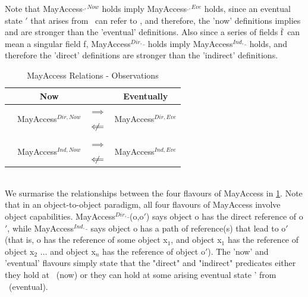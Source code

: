 \documentclass[a4paper,11pt,twoside]{article}
\newcommand*\rot{\rotatebox{90}}
\newcommand{\loimplies}{$\implies$}
\newcommand{\lonimplies}{$\centernot\implies$}
\newcommand{\loimpliedby}{$\Longleftarrow$}
\newcommand{\lonimpliedby}{$\centernot\Longleftarrow$}
\newcommand{\losigma}{\text{$\upsigma$}}
\newcommand{\loconj}[1] {$\bar{\text{#1}}$}
\begin{document}
Note that MayAccess$^{\_,Now}$ holds imply MayAccess$^{\_,Eve}$ holds, since an eventual state \losigma$'$ that arises from \losigma\, can refer to \losigma, and therefore, the 'now' definitions implies and are stronger than the 'eventual' definitions. Also since a series of fields \loconj{f}\ can mean a singular field f, MayAccess$^{Dir,\_}$ holds imply MayAccess$^{Ind,\_}$ holds, and therefore the 'direct' definitions are stronger than the 'indirect' definitions. \\
\begin{table}[htb]
\caption{MayAccess Relations - Observations}\label{tab:accessrelations}
\centering
\begin{tabular*}{0.5\linewidth}{c|ccc}\toprule
& \bf Now & & \bf Eventually\\
\hline
\multirow{5}{*}{\rot{\bf Indirect \enspace Direct \:}} & \multirow{2}{*}{MayAccess$^{Dir,Now}$} & \loimplies & \multirow{2}{*}{MayAccess$^{Dir, Eve}$} \\
& & \lonimpliedby &  \\
& \rot{\loimpliedby} \rot{\lonimplies}& &\rot{\loimpliedby} \rot{\lonimplies} \\
& \multirow{2}{*}{MayAccess$^{Ind,Now}$} & \loimplies & \multirow{2}{*}{MayAccess$^{Ind, Eve}$} \\
& & \lonimpliedby &\\
\end{tabular*}
\end{table}\\
We surmarise the relationships between the four flavours of MayAccess in \cref{tab:accessrelations}. Note that in an object-to-object paradigm, all four flavours of MayAccess involve object capabilities. MayAccess$^{Dir,\_}$(o,o$'$) says object o has the direct reference of o$'$, while MayAccess$^{Ind,\_}$ says object o has a path of reference(s) that lead to o$'$ (that is, o has the reference of some object x$_1$, and object x$_1$ has the reference of object x$_2$ $\dots$ and object x$_n$ has the reference of object o$'$). The 'now' and 'eventual' flavours simply state that the "direct" and "indirect" predicates either they hold at \losigma\ (now) or they can hold at some arising eventual state \losigma' from \losigma\ (eventual).
\end{document}
